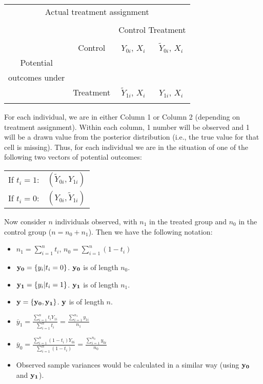 \documentclass[oneside,letterpaper,titlepage,12pt]{article}
\begin{document}
\begin{center}
\begin{tabular}{cc|c|c|}
\multicolumn{4}{c}{\hspace*{4cm} Actual treatment assignment} \\
\\
\multicolumn{2}{c}{} & \multicolumn{2}{c}{Control \hfill Treatment} \\
\cline{3-4}
& & & \phantom{abcd} \\
& Control & $Y_{0i}$, $X_i$ & $\tilde{Y}_{0i}$, $X_i$ \\
Potential & & &  \phantom{abcd} \\
\cline{3-4}
outcomes under & & & \phantom{abcd} \\
& Treatment  & $\tilde{Y}_{1i}$, $X_i$ & $Y_{1i}$, $X_i$ \\
& & & \phantom{abcd} \\
\cline{3-4}
\end{tabular}
\end{center}
 
For each individual, we are in either Column 1 or Column 2 (depending on treatment assignment).  Within each column, 1 number will be observed and 1 will be a drawn
value from the posterior distribution (i.e., the true value for that cell is missing). Thus, for each individual we are in the situation of one of the 
following two vectors of potential outcomes:

\begin{center}
\begin{tabular}{rl}
If $t_i=1$: & $(\tilde Y_{0i}, Y_{1i})$ \\
If $t_i=0$: & $(Y_{0i}, \tilde Y_{1i})$ \\
\end{tabular}
\end{center}

Now consider $n$ individuals observed, with $n_1$ in the treated group and $n_0$ in the control group ($n=n_0+n_1$).  Then we have the following notation:
\begin{itemize}
\item $n_1=\sum_{i=1}^n t_i$, $n_0=\sum_{i=1}^n (1-t_i)$
\item ${\bf y_0} = \{y_{i}|t_i=0\}$.  ${\bf y_0}$ is of length $n_0$.
\item ${\bf y_1} = \{y_{i}|t_i=1\}$.  ${\bf y_1}$ is of length $n_1$.
\item ${\bf y} = \{ {\bf y_0}, {\bf y_1}\}$.  ${\bf y}$ is of length $n$.
\item $\overline{y}_1 = \frac{\sum_{i=1}^n t_i Y_{1i}}{\sum_{i=1}^n t_i}=\frac{\sum_{i=1}^{n_1} y_{1i}}{n_1}$
\item $\overline{y}_0 = \frac{\sum_{i=1}^n (1-t_i) Y_{0i}}{\sum_{i=1}^n (1-t_i)}=\frac{\sum_{i=1}^{n_0} y_{0i}}{n_0}$
\item Observed sample variances would be calculated in a similar way (using ${\bf y_0}$ and ${\bf y_1}$).
\end{itemize}
\end{document}
